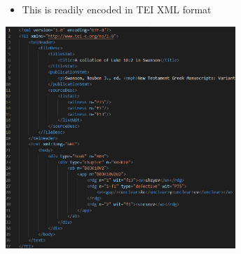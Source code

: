 \documentclass[10pt]{beamer}
\begin{document}
	\begin{frame}
		\begin{itemize}
			\item This is readily encoded in TEI XML format
		\end{itemize}
		\begin{center}
			\includegraphics[width=0.65\textwidth]{../img/collation-xml.png}
		\end{center}
	\end{frame}
\end{document}
